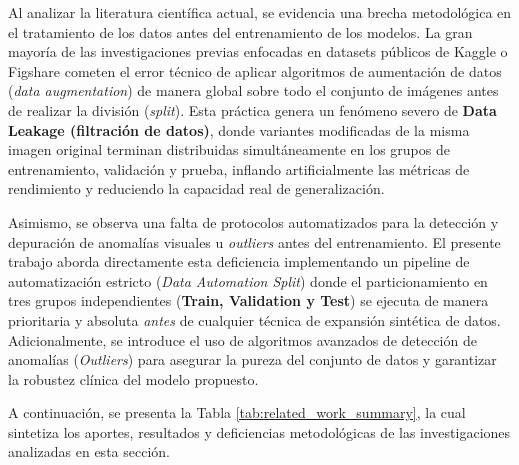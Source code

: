 Al analizar la literatura científica actual, se evidencia una brecha metodológica en el tratamiento de los datos antes del entrenamiento de los modelos. La gran mayoría de las investigaciones previas enfocadas en datasets públicos de Kaggle o Figshare \cite{Disci2025, BabuVimala2023, DwiPrayogo2025, Mitra2025, Panigrahi2025, Jain2025} cometen el error técnico de aplicar algoritmos de aumentación de datos (\textit{data augmentation}) de manera global sobre todo el conjunto de imágenes antes de realizar la división (\textit{split}). Esta práctica genera un fenómeno severo de \textbf{Data Leakage (filtración de datos)}, donde variantes modificadas de la misma imagen original terminan distribuidas simultáneamente en los grupos de entrenamiento, validación y prueba, inflando artificialmente las métricas de rendimiento y reduciendo la capacidad real de generalización.

Asimismo, se observa una falta de protocolos automatizados para la detección y depuración de anomalías visuales u \textit{outliers} antes del entrenamiento. El presente trabajo aborda directamente esta deficiencia implementando un pipeline de automatización estricto (\textit{Data Automation Split}) donde el particionamiento en tres grupos independientes (\textbf{Train, Validation y Test}) se ejecuta de manera prioritaria y absoluta \textit{antes} de cualquier técnica de expansión sintética de datos. Adicionalmente, se introduce el uso de algoritmos avanzados de detección de anomalías (\textit{Outliers}) para asegurar la pureza del conjunto de datos y garantizar la robustez clínica del modelo propuesto.

A continuación, se presenta la Tabla \ref{tab:related_work_summary}, la cual sintetiza los aportes, resultados y deficiencias metodológicas de las investigaciones analizadas en esta sección.

